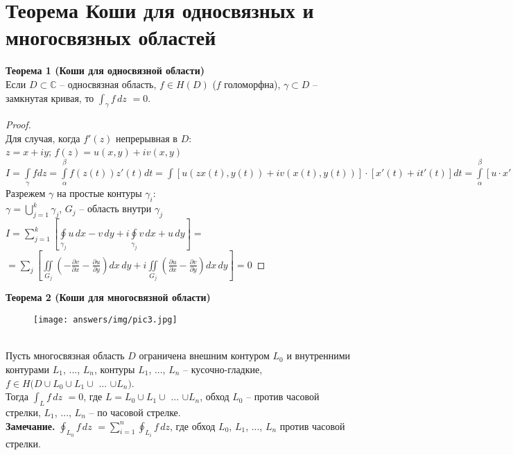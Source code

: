 \newpage
\section{Теорема Коши для односвязных и многосвязных областей}
\textbf{Теорема 1 (Коши для односвязной области)}\\
Если $D \subset \mathbb{C}$ -- односвязная область, $f \in H(D)$ ($f$ голоморфна), $\gamma \subset D$ -- замкнутая кривая, то \(\int_{\gamma} f\, dz\) $= 0$.


\begin{proof}
    \ \\
    Для случая, когда $f'(z)$ непрерывная в $D$:\\
    $z=x+iy$; $f(z)=u(x,y)+iv(x,y)$\\
    $I = \int\limits_{\gamma}fdz = \int\limits_{\alpha}^{\beta}f(z(t))z'(t)dt = \int[u(zx(t),y(t))+iv(x(t), y(t))]\cdot [x'(t)+it'(t)]dt = \int\limits_{\alpha}^{\beta}[u\cdot x'-v\cdot y')+i(uy'+vx')]dt=\int\limits_{\alpha}^{\beta}(ux'-vy')dt+i\int\limits_{\alpha}^{\beta}(uy'+vx')dt = \int\limits_{\gamma}udx-vdy +i\int\limits_{\gamma}udy+vdx=$
    Разрежем $\gamma$ на простые контуры $\gamma_i$:\\
    $\gamma=\bigcup\limits_{j=1}^{k}\gamma_j$, $G_j$ -- область внутри $\gamma_j$\\
    $I = \sum_{j=1}^k \left[ \oint\limits_{\gamma_j}u\,dx-v\,dy+i\oint\limits_{\gamma_j}v\,dx+u\,dy \right] =$\\
    $= \sum_j \left[ \iint\limits_{G_j}\left(-\frac{\partial v}{\partial x}-\frac{\partial u}{\partial y} \right)dx\,dy + i\iint\limits_{G_j}\left(\frac{\partial u}{\partial x}-\frac{\partial v}{\partial y} \right)dx\,dy \right] = 0$
\end{proof}


\textbf{Теорема 2 (Коши для многосвязной области)}\\
\begin{figure}[!ht]
\begin{center}
\texttt{[image: answers/img/pic3.jpg]}
\end{center}
\end{figure}\\
Пусть многосвязная область $D$ ограничена внешним контуром $L_0$ и внутренними контурами $L_1$, ..., $L_n$, контуры $L_1$, ..., $L_n$ -- кусочно-гладкие, $f \in H(D \cup L_0 \cup L_1 \cup$ ... $\cup L_n)$.\\
Тогда \(\int_L f\, dz\) $= 0$, где $L = L_0 \cup L_1 \cup$ ... $\cup L_n$, обход $L_0$ -- против часовой стрелки, $L_1$, ..., $L_n$ -- по часовой стрелке.\\
\textbf{Замечание.} \(\oint_{L_0} f\, dz\) 
$= \sum_{i = 1}^{n}$\(\oint_{L_i} f\, dz\), где обход $L_0$, $L_1$, ..., $L_n$ против часовой стрелки.


